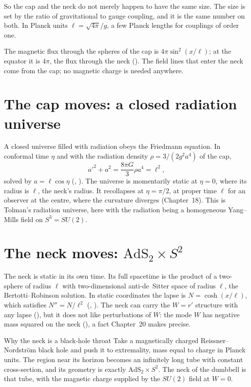 So the cap and the neck do not merely happen to have the same size. The size is set by the ratio of gravitational to gauge coupling, and it is the same number on both. In Planck units $\ell=\sqrt{4\pi}/g$, a few Planck lengths for couplings of order one.

The magnetic flux through the spheres of the cap is $4\pi\sin^2(x/\ell)$; at the equator it is $4\pi$, the flux through the neck (). The field lines that enter the neck come from the cap; no magnetic charge is needed anywhere.

\section{The cap moves: a closed radiation universe}

A closed universe filled with radiation obeys the Friedmann equation. In conformal time $\eta$ and with the radiation density $\rho=3/(2g^2a^4)$ of the cap,
\[
a'^2+a^2=\frac{8\pi G}{3}\rho a^4=\ell^2 ,
\]
solved by $a=\ell\cos\eta$ (, ). The universe is momentarily static at $\eta=0$, where its radius is $\ell$, the neck's radius. It recollapses at $\eta=\pi/2$, at proper time $\ell$ for an observer at the centre, where the curvature diverges (Chapter~18). This is Tolman's radiation universe, here with the radiation being a homogeneous Yang--Mills field on $S^3=SU(2)$.

\section{The neck moves: $\mathrm{AdS}_2\times S^2$}

The neck is static in its own time. Its full spacetime is the product of a two-sphere of radius $\ell$ with two-dimensional anti-de~Sitter space of radius $\ell$, the Bertotti--Robinson solution. In static coordinates the lapse is $N=\cosh(x/\ell)$, which satisfies $N''=N/\ell^2$ (, ). The neck can carry the $W=r'$ structure with any lapse (), but it does not like perturbations of $W$: the mode $W$ has negative mass squared on the neck (), a fact Chapter~20 makes precise.

\begin{asidebox}{Why the neck is a black-hole throat}
Take a magnetically charged Reissner--Nordstr\"om black hole and push it to extremality, mass equal to charge in Planck units. The region near its horizon becomes an infinitely long tube with constant cross-section, and its geometry is exactly $\mathrm{AdS}_2\times S^2$. The neck of the dumbbell is that tube, with the magnetic charge supplied by the $SU(2)$ field at $W=0$.
\end{asidebox}

